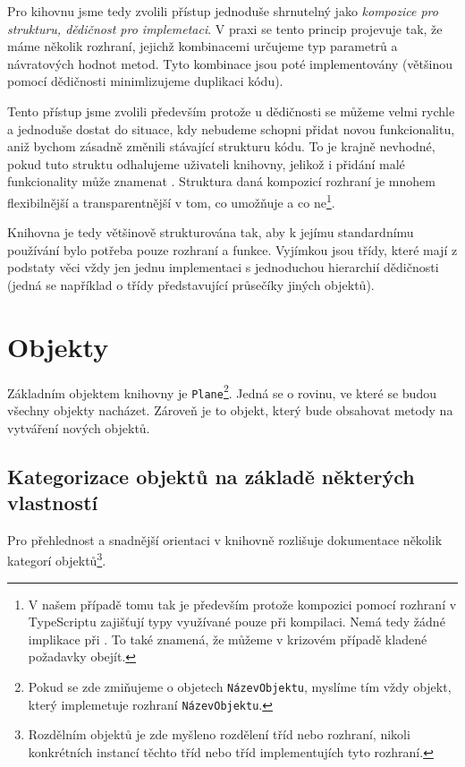 Pro kihovnu jsme tedy zvolili přístup jednoduše shrnutelný jako \textit{kompozice pro strukturu, dědičnost pro implemetaci}.
V praxi se tento princip projevuje tak, že máme několik rozhraní, jejichž kombinacemi určujeme typ parametrů a návratových hodnot metod.
Tyto kombinace jsou poté implementovány (většinou pomocí dědičnosti minimlizujeme duplikaci kódu).

Tento přístup jsme zvolili především protože u dědičnosti se můžeme velmi rychle a jednoduše dostat do situace, kdy nebudeme schopni přidat novou funkcionalitu, aniž bychom zásadně změnili stávající strukturu kódu.
To je krajně nevhodné, pokud tuto struktu odhalujeme uživateli knihovny, jelikož i přidání malé funkcionality může znamenat .
Struktura daná kompozicí rozhraní je mnohem flexibilnější a transparentnější v tom, co umožňuje a co ne\footnote{V našem případě tomu tak je především protože kompozici pomocí rozhraní v TypeScriptu zajišťují typy využívané pouze při kompilaci. Nemá tedy žádné implikace při . To také znamená, že můžeme v krizovém případě kladené požadavky obejít.}.

Knihovna je tedy většinově strukturována tak, aby k jejímu standardnímu používání bylo potřeba  pouze rozhraní a funkce.
Vyjímkou jsou třídy, které mají z podstaty věci vždy jen jednu implementaci s jednoduchou hierarchií dědičnosti (jedná se například o třídy představující průsečíky jiných objektů).

\section{Objekty}
\label{sec:objects}

Základním objektem knihovny je \texttt{Plane}\footnote{Pokud se zde zmiňujeme o objetech \texttt{NázevObjektu}, myslíme tím vždy objekt, který implemetuje rozhraní \texttt{NázevObjektu}.}. 
Jedná se o rovinu, ve které se budou všechny objekty nacházet.
Zároveň je to objekt, který bude obsahovat metody na vytváření nových objektů.

\subsection[Kategorizace]{Kategorizace objektů na základě některých vlastností}
\label{subsec:object-categorization}

Pro přehlednost a snadnější orientaci v knihovně rozlišuje dokumentace několik kategorí objektů\footnote{Rozdělním objektů je zde myšleno rozdělení tříd nebo rozhraní, nikoli konkrétních instancí těchto tříd nebo tříd implementujích tyto rozhraní.}.

